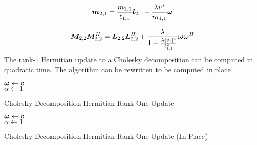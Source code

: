 \begin{appendices}
\begin{equation}
\bm{m}_{2,1} = \frac{m_{1,1}}{\ell_{1,1}} \bm{l}_{2,1} + \frac{\lambda v_1^{*}}{m_{1,1}}\bm{\omega}
\end{equation}

\begin{equation}
\bm{M}_{2,2}\bm{M}_{2,2}^H = \bm{L}_{2,2}\bm{L}_{2,2}^H + \frac{\lambda}{1 + \frac{\lambda |v_1|^2}{\ell_{1,1}^2}}\bm{\omega}\bm{\omega}^H
\end{equation}
The rank-$1$ Hermitian update to a Cholesky decomposition can be computed in quadratic time. The algorithm can be rewritten to be computed in place.

\begin{algorithm}[H]
\SetAlgoLined
   $\bm{\omega} \leftarrow \bm{v}$ \\
   $\alpha \leftarrow 1$ \\
 \caption{Cholesky Decomposition Hermitian Rank-One Update}
\end{algorithm} 




\begin{algorithm}[H]
\SetAlgoLined
   $\bm{\omega} \leftarrow \bm{v}$ \\
   $\alpha \leftarrow 1$ \\
 \caption{Cholesky Decomposition Hermitian Rank-One Update (In Place)}
\end{algorithm} 





\end{appendices}
